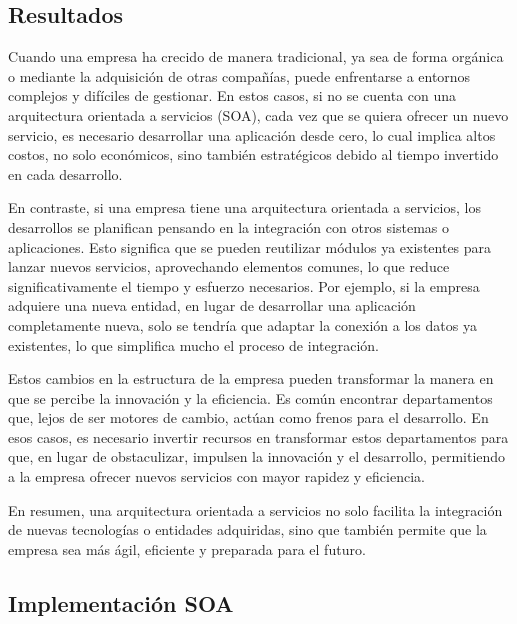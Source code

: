 \documentclass[10pt]{article}
\begin{document}
\vspace{0.5cm}
\begin{center}
    \section{Resultados}
\end{center}    
    \hspace*{2.5em} Cuando una empresa ha crecido de manera tradicional, ya sea de forma orgánica o mediante la adquisición de otras compañías, puede enfrentarse a entornos complejos y difíciles de gestionar. En estos casos, si no se cuenta con una arquitectura orientada a servicios (SOA), cada vez que se quiera ofrecer un nuevo servicio, es necesario desarrollar una aplicación desde cero, lo cual implica altos costos, no solo económicos, sino también estratégicos debido al tiempo invertido en cada desarrollo.

    En contraste, si una empresa tiene una arquitectura orientada a servicios, los desarrollos se planifican pensando en la integración con otros sistemas o aplicaciones. Esto significa que se pueden reutilizar módulos ya existentes para lanzar nuevos servicios, aprovechando elementos comunes, lo que reduce significativamente el tiempo y esfuerzo necesarios. Por ejemplo, si la empresa adquiere una nueva entidad, en lugar de desarrollar una aplicación completamente nueva, solo se tendría que adaptar la conexión a los datos ya existentes, lo que simplifica mucho el proceso de integración.
    \newpage
    
    Estos cambios en la estructura de la empresa pueden transformar la manera en que se percibe la innovación y la eficiencia. Es común encontrar departamentos que, lejos de ser motores de cambio, actúan como frenos para el desarrollo. En esos casos, es necesario invertir recursos en transformar estos departamentos para que, en lugar de obstaculizar, impulsen la innovación y el desarrollo, permitiendo a la empresa ofrecer nuevos servicios con mayor rapidez y eficiencia.
    
    En resumen, una arquitectura orientada a servicios no solo facilita la integración de nuevas tecnologías o entidades adquiridas, sino que también permite que la empresa sea más ágil, eficiente y preparada para el futuro.

    \begin{center}
    \section{Implementación SOA}
    \end{center} 
\end{document}
